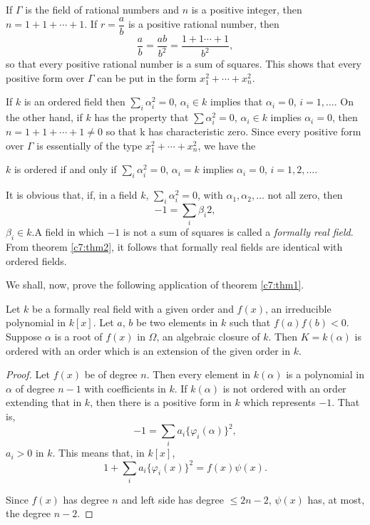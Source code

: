 If $\Gamma$ is the field of rational numbers and $n$ is a positive
integer, then $n=1+1+\cdots +1$. If $r=\dfrac{a}{b}$ is a positive
rational number, then
$$
\frac{a}{b} = \frac{ab}{b^2} = \frac{1+1\cdots + 1}{b^2},
$$
so that every positive rational number is a sum of squares. This shows
that every positive form over $\Gamma$ can be put in the form $x^2_1 +
\cdots + x^2_n$.

If $k$ is an ordered field then $\sum\limits_i \alpha^2_i = 0$,
$\alpha_i \in k$ implies that $\alpha_i =0$, $i=1,\ldots$. On the
other hand, if $k$ has the property that $\sum \alpha^2_i = 0$,
$\alpha_i \in k$ implies $\alpha_i=0$, then $n=1+1+\cdots + 1 \neq 0$
so that k has characteristic zero. Since every positive form over
$\Gamma$ is essentially of the type $x^2_1+\cdots + x^2_n$, we have
the 

\begin{thm}\label{c7:thm2}%
$k$ is ordered if and only if $\sum\limits_i \alpha^2_i =0$, $\alpha_i
  = k$ implies $\alpha_i =0$, $i=1, 2, \ldots$.
\end{thm}

It is obvious that, if, in a field $k$, $\sum\limits_i \alpha^2_i=0$,
with $\alpha_1, \alpha_2, \ldots$ not all zero, then
$$
-1 = \sum_i \beta_i 2, 
$$
$\beta_i \in k$.\pageoriginale A field in which $-1$ is not a sum of
squares is called a \textit{formally real field}. From theorem
\ref{c7:thm2}, it follows that formally real fields are identical
with ordered fields.  

We shall, now, prove the following application of theorem \ref{c7:thm1}.

\begin{thm}\label{c7:thm3}%
Let $k$ be a formally real field with a given order and $f(x)$, an
irreducible polynomial in $k[x]$. Let $a$, $b$ be two elements in $k$
such that $f(a) f(b) <0$. Suppose $\alpha$ is a root of $f(x)$ in
$\Omega$, an algebraic closure of $k$. Then $K=k(\alpha)$ is ordered
with an order which is an extension of the given order in $k$.
\end{thm}

\begin{proof}
Let $f(x)$ be of degree $n$. Then every element in $k(\alpha)$ is a
polynomial in $\alpha$ of degree $n-1$ with coefficients in $k$. If
$k(\alpha)$ is not ordered with an order extending that in $k$, then
there is a positive form in $k$ which represents $-1$. That is, 
$$
-1 = \sum_i a_i \{\varphi_i (\alpha)\}^2,
$$
$a_i>0$ in $k$. This means that, in $k[x]$,
$$
1+\sum_i a_i \{\varphi_i(x)\}^2 = f(x) \psi(x).
$$

Since $f(x)$ has degree $n$ and left side has degree $\leq 2n-2$,
$\psi (x)$ has, at most, the degree $n-2$.
\end{proof}

